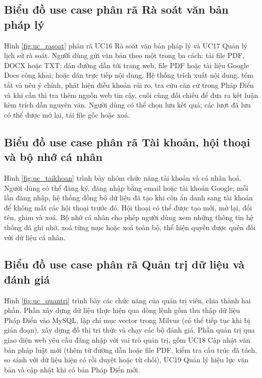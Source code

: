 \documentclass[../DoAn.tex]{subfiles}
\begin{document}

\subsection{Biểu đồ use case phân rã Rà soát văn bản pháp lý}
\label{subsection:2.2.3}
Hình \ref{fig:uc_rasoat} phân rã UC16 Rà soát văn bản pháp lý và UC17 Quản lý lịch sử rà soát. Người dùng gửi văn bản theo một trong ba cách: tải file PDF, DOCX hoặc TXT; dán đường dẫn tới trang web, file PDF hoặc tài liệu Google Docs công khai; hoặc dán trực tiếp nội dung. Hệ thống trích xuất nội dung, tóm tắt và nêu ý chính, phát hiện điều khoản rủi ro, tra cứu căn cứ trong Pháp Điển và khi cần thì tra thêm nguồn web tin cậy, cuối cùng đối chiếu để đưa ra kết luận kèm trích dẫn nguyên văn. Người dùng có thể chọn lưu kết quả; các lượt đã lưu có thể được mở lại, tải file gốc hoặc xoá.


\subsection{Biểu đồ use case phân rã Tài khoản, hội thoại và bộ nhớ cá nhân}
\label{subsection:2.2.4}
Hình \ref{fig:uc_taikhoan} trình bày nhóm chức năng tài khoản và cá nhân hoá. Người dùng có thể đăng ký, đăng nhập bằng email hoặc tài khoản Google; mỗi lần đăng nhập, hệ thống đồng bộ dữ liệu đã tạo khi còn ẩn danh sang tài khoản để không mất các hội thoại trước đó. Hội thoại có thể được tạo mới, mở lại, đổi tên, ghim và xoá. Bộ nhớ cá nhân cho phép người dùng xem những thông tin hệ thống đã ghi nhớ, xoá từng mục hoặc xoá toàn bộ, thể hiện quyền được quên đối với dữ liệu cá nhân.


\subsection{Biểu đồ use case phân rã Quản trị dữ liệu và đánh giá}
\label{subsection:2.2.5}
Hình \ref{fig:uc_quantri} trình bày các chức năng của quản trị viên, chia thành hai phần. Phần xây dựng dữ liệu thực hiện qua dòng lệnh gồm thu thập dữ liệu Pháp Điển vào MySQL, lập chỉ mục vector trong Milvus (có thể tiếp tục khi bị gián đoạn), xây dựng đồ thị tri thức và chạy các bộ đánh giá. Phần quản trị qua giao diện web yêu cầu đăng nhập với vai trò quản trị, gồm UC18 Cập nhật văn bản pháp luật mới (thêm từ đường dẫn hoặc file PDF, kiểm tra cấu trúc đã tách, so sánh với dữ liệu hiện có rồi duyệt hoặc từ chối), UC19 Quản lý hiệu lực văn bản và cập nhật khi có bản Pháp Điển mới.
\end{document}
